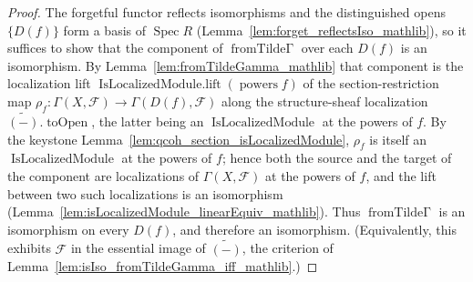 \begin{proof}
  The forgetful functor reflects isomorphisms and the distinguished opens \(\{D(f)\}\) form a basis
  of \(\operatorname{Spec} R\) (Lemma~\ref{lem:forget_reflectsIso_mathlib}), so it suffices to show
  that the component of \(\operatorname{fromTilde\Gamma}\) over each \(D(f)\) is an isomorphism. By
  Lemma~\ref{lem:fromTildeGamma_mathlib} that component is the localization lift
  \(\operatorname{IsLocalizedModule.lift}(\operatorname{powers} f)\) of the section-restriction map
  \(\rho_f : \Gamma(X, \mathcal{F}) \to \Gamma(D(f), \mathcal{F})\) along the structure-sheaf
  localization \(\widetilde{(-)}.\operatorname{toOpen}\), the latter being an
  \(\operatorname{IsLocalizedModule}\) at the powers of \(f\). By the keystone
  Lemma~\ref{lem:qcoh_section_isLocalizedModule}, \(\rho_f\) is itself an
  \(\operatorname{IsLocalizedModule}\) at the powers of \(f\); hence both the source and the target of
  the component are localizations of \(\Gamma(X, \mathcal{F})\) at the powers of \(f\), and the lift
  between two such localizations is an isomorphism
  (Lemma~\ref{lem:isLocalizedModule_linearEquiv_mathlib}). Thus
  \(\operatorname{fromTilde\Gamma}\) is an isomorphism on every \(D(f)\), and therefore an
  isomorphism. (Equivalently, this exhibits \(\mathcal{F}\) in the essential image of
  \(\widetilde{(-)}\), the criterion of Lemma~\ref{lem:isIso_fromTildeGamma_iff_mathlib}.)
\end{proof}

